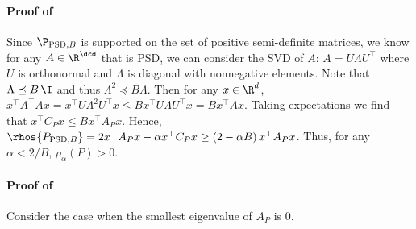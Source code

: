 \paragraph{Proof of }
Since $\P_{\text{PSD},B}$ is supported on the set of positive semi-definite matrices, we know for any $A\in \R^{\dcd}$ that is PSD, we can consider the SVD of $A$: $A = U \Lambda U^\top$ where $U$ is orthonormal and $\Lambda$ is diagonal with
nonnegative elements. Note that $\Lambda \preceq B\, \I$ and thus $\Lambda^2 \preceq B \Lambda$.
Then for any $x\in \R^d$, $x^\top A^\top A x = x^\top U \Lambda^2 U^\top x \le B x^\top U \Lambda U^\top x = B x^\top A x$.
Taking expectations we find that $x^\top C_P x \le B x^\top A_P x$.
Hence, $\rhos{P_{\text{PSD},B}} = 2 x^\top A_P x - \alpha x^\top C_P x \ge (2- \alpha B ) \,x^\top A_P x $.
Thus, for any $\alpha<2/B$, $\rho_\alpha(P)>0$.


\paragraph{Proof of }
Consider the case when the smallest eigenvalue of $A_P$ is $0$.
